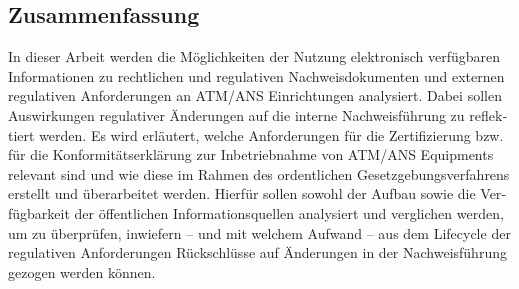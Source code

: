 \begin{otherlanguage}{ngerman}
    \chapter*{Zusammenfassung}

    In dieser Arbeit werden die Möglichkeiten der Nutzung elektronisch verfügbaren Informationen zu rechtlichen und regulativen Nachweisdokumenten und externen regulativen Anforderungen an ATM/ANS Einrichtungen analysiert. Dabei sollen Auswirkungen regulativer Änderungen auf die interne Nachweisführung zu reflektiert werden. 
    Es wird erläutert, welche Anforderungen für die Zertifizierung bzw. für die Konformitätserklärung  zur Inbetriebnahme von ATM/ANS Equipments relevant sind und wie diese im Rahmen des ordentlichen Gesetzgebungsverfahrens erstellt und überarbeitet werden. 
    Hierfür sollen sowohl der Aufbau sowie die Verfügbarkeit der öffentlichen Informationsquellen analysiert und verglichen werden, um zu überprüfen, inwiefern -- und mit welchem Aufwand -- aus dem Lifecycle der regulativen Anforderungen Rückschlüsse auf Änderungen in der Nachweisführung gezogen werden können.
 
\end{otherlanguage}
